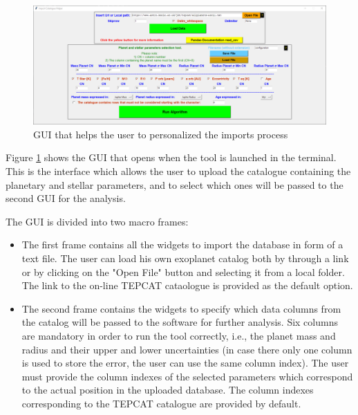 \documentclass[preprint,12pt]{elsarticle}
\begin{document}
        	\begin{figure}[H]
        		\caption{GUI that helps the user to personalized the imports process}
        		\label{fig:GUI1}
        		\centering
        		\includegraphics[width=1\textwidth]{pictures/Import_Catalogue_Helper.PNG}
        	\end{figure}
	
        	Figure \ref{fig:GUI1} shows the GUI that opens when the tool is launched in the terminal. 
            This is the interface which allows the user to upload the catalogue containing the planetary and stellar parameters, and to select which ones will be passed to the second GUI for the analysis. 
            
            The GUI is divided into two macro frames:
            \begin{itemize}
                \item The first frame contains all the widgets to import the database in form of a text file. The user can load his own exoplanet catalog both by through a link or by clicking on the "Open File" button and selecting it from a local folder. The link to the on-line TEPCAT cataologue \textit{\cite{Southworth2011}} is provided as the default option.
                \item  The second frame contains the widgets to specify which data columns from the catalog will be passed to the software for further analysis.
                Six columns are mandatory in order to run the tool correctly, i.e., the planet mass and radius and their upper and lower uncertainties (in case there only one column is used to store the error, the user can use the same column index).
                The user must provide the column indexes of the selected parameters which correspond to the actual position in the uploaded database. 
                The column indexes corresponding to the TEPCAT catalogue are provided by default.
            \end{itemize}
    
\end{document}
